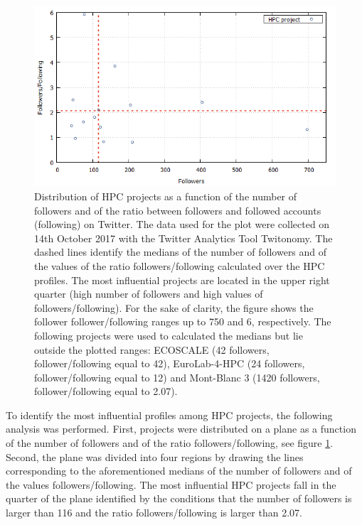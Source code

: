 \begin{figure}[!t] 
 \begin{center}
 \includegraphics[scale=0.4]{Images/HPC_influence.png}
 \caption{Distribution of HPC projects as a function of the number of followers and of the ratio between followers and followed accounts (following) on Twitter. The data used for the plot were collected on 14th October 2017 with the Twitter Analytics Tool Twitonomy. The dashed lines identify the medians of the number of followers and of the values of the ratio followers/following calculated over the HPC profiles. The most influential projects are located in the upper right quarter (high number of followers and high values of followers/following). For the sake of clarity, the figure shows the follower follower/following ranges up to 750 and 6, respectively. The following projects were used to calculated the medians but lie outside the plotted ranges: ECOSCALE (42 followers, follower/following equal to 42), EuroLab-4-HPC (24 followers, follower/following equal to 12) and Mont-Blanc 3 (1420 followers, follower/following equal to 2.07).}
 \label{HPC_influence_plot}
 \end{center}
\end{figure}

To identify the most influential profiles among HPC projects, the following analysis was performed. First, projects were distributed on a plane as a function of the number of followers and of the ratio followers/following, see figure \ref{HPC_influence_plot}. Second, the plane was divided into four regions by drawing the lines corresponding to the aforementioned medians of the number of followers and of the values followers/following. The most influential HPC projects fall in the quarter of the plane identified by the conditions that the number of followers is larger than 116 and the ratio followers/following is larger than 2.07.

